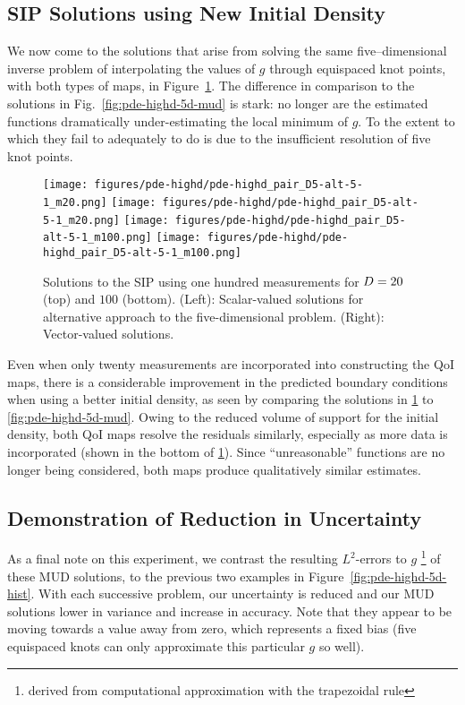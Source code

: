 \subsection{SIP Solutions using New Initial Density}
We now come to the solutions that arise from solving the same five--dimensional inverse problem of interpolating the values of $g$ through equispaced knot points, with both types of maps, in Figure~\ref{fig:pde-highd-5d-alt-mud}.
The difference in comparison to the solutions in Fig.~\ref{fig:pde-highd-5d-mud} is stark: no longer are the estimated functions dramatically under-estimating the local minimum of $g$.
To the extent to which they fail to adequately to do is due to the insufficient resolution of five knot points.

\begin{figure}
\centering
  \texttt{[image: figures/pde-highd/pde-highd\_pair\_D5-alt-5-1\_m20.png]}
  \texttt{[image: figures/pde-highd/pde-highd\_pair\_D5-alt-5-1\_m20.png]}
  \texttt{[image: figures/pde-highd/pde-highd\_pair\_D5-alt-5-1\_m100.png]}
  \texttt{[image: figures/pde-highd/pde-highd\_pair\_D5-alt-5-1\_m100.png]}
\caption{Solutions to the SIP using one hundred measurements for $D = 20$ (top) and $100$ (bottom).
(Left): Scalar-valued solutions for alternative approach to the five-dimensional problem.
(Right): Vector-valued solutions.
}
\label{fig:pde-highd-5d-alt-mud}
\end{figure}

Even when only twenty measurements are incorporated into constructing the QoI maps, there is a considerable improvement in the predicted boundary conditions when using a better initial density, as seen by comparing the solutions in \ref{fig:pde-highd-5d-alt-mud} to \ref{fig:pde-highd-5d-mud}.
Owing to the reduced volume of support for the initial density, both QoI maps resolve the residuals similarly, especially as more data is incorporated (shown in the bottom of \ref{fig:pde-highd-5d-alt-mud}).
Since ``unreasonable'' functions are no longer being considered, both maps produce qualitatively similar estimates.

\subsection{Demonstration of Reduction in Uncertainty}
As a final note on this experiment, we contrast the resulting $L^2$-errors to $g$ \footnote{derived from computational approximation with the trapezoidal rule} of these MUD solutions, to the previous two examples in Figure~\ref{fig:pde-highd-5d-hist}.
With each successive problem, our uncertainty is reduced and our MUD solutions lower in variance and increase in accuracy.
Note that they appear to be moving towards a value away from zero, which represents a fixed bias (five equispaced knots can only approximate this particular $g$ so well).

